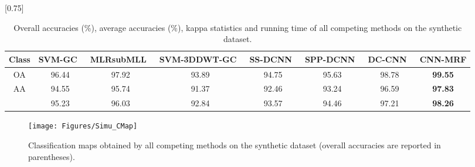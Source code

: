\documentclass[journal]{IEEEtran}
\begin{document}
		\begin{table*}[htp]
			\caption{\label{table_simu} {{Overall accuracies (\%), average accuracies (\%), kappa statistics and running time of all competing methods on the synthetic dataset.}}}
			\begin{center}
				{\normalsize
					\scalebox{0.75}[0.75]
					{
						\begin{tabular}{|c||c|c|c|c|c|c|c|}
							\hline
							Class   & SVM-GC~\cite{tarabalka2010svm}   & MLRsubMLL~\cite{li2012spectral}  & SVM-3DDWT-GC~\cite{cao2017integration}  &  SS-DCNN~\cite{yue2015spectral} & SPP-DCNN~\cite{yue2016deep} & DC-CNN~\cite{zhang2017spectral} & CNN-MRF \\ 
							\hline
							OA      & 96.44    & 97.92      & 93.89     &    94.75  &  95.63    & 98.78 & \bf{99.55}  \\ 
							\hline
							AA      & 94.55    & 95.74      & 91.37     &    92.46  &  93.24   & 96.59  & \bf{97.83}  \\ 
							\hline
							   & 95.23    & 96.03      & 92.84     & 93.57   & 94.46   & 97.21  & \bf{98.26}  \\ 
\hline 
						\end{tabular}
					}
				}
			\end{center}
		\end{table*}	
		
		\begin{figure*}
			\centering
			\texttt{[image: Figures/Simu\_CMap]}
			\caption{{{Classification maps obtained by all competing methods on the synthetic dataset (overall accuracies are reported in parentheses).}}}\label{fig_simu}
		\end{figure*}
		
		
		
\end{document}
